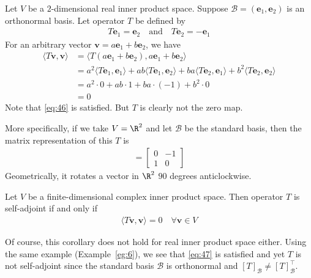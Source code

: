 \documentclass[thmcnt=section, color=blue, 12pt]{my-elegantbook}
\begin{document}
\begin{example} \label{eg:6}
	Let $V$ be a $2$-dimensional real inner product space.
	Suppose $\mathcal{B} = (\mathbf{e}_1, \mathbf{e}_2)$
	is an orthonormal basis.
	Let operator $T$ be defined by 
	\begin{align*}
		T \mathbf{e}_1 = \mathbf{e}_2
		\quad \text{and} \quad 
		T \mathbf{e}_2 = -\mathbf{e}_1
	\end{align*}
	For an arbitrary 
	vector $\mathbf{v} = a\mathbf{e}_1 + b\mathbf{e}_2$,
	we have 
	\begin{align*}
		\langle T \mathbf{v}, \mathbf{v} \rangle
		&= \langle T (a\mathbf{e}_1 + b\mathbf{e}_2), 
		a\mathbf{e}_1 + b \mathbf{e}_2 \rangle \\
		&= a^2 \langle T \mathbf{e}_1, \mathbf{e}_1 \rangle
		+ ab \langle T \mathbf{e}_1, \mathbf{e}_2 \rangle
		+ ba \langle T \mathbf{e}_2, \mathbf{e}_1 \rangle
		+ b^2 \langle T \mathbf{e}_2, \mathbf{e}_2 \rangle \\
		&= a^2 \cdot 0 + ab \cdot 1 + ba \cdot (-1) + b^2 \cdot 0 \\
		&= 0
	\end{align*}
	Note that \eqref{eq:46} is satisfied. 
	But $T$ is clearly not the zero map.

	More specifically, if we take $V = \R^2$ 
	and let $\mathcal{B}$ be the standard basis,
	then the matrix representation of this $T$
	is 
	\begin{align*}
		[T] = \begin{bmatrix}
			0 & -1\\
			1 & 0
		\end{bmatrix}
	\end{align*}
	Geometrically, it rotates a vector in $\R^2$ $90$ degrees anticlockwise. 
\end{example}


\begin{corollary} \label{cor:8}
	Let $V$ be a finite-dimensional complex inner product space.
	Then operator $T$ is self-adjoint if and only if 
	\begin{align}
		\langle T \mathbf{v}, \mathbf{v} \rangle = 0
		\quad \forall \mathbf{v} \in V
		\label{eq:47}
	\end{align}
\end{corollary}

\begin{note}
	Of course, this corollary does
	not hold for real inner product space either.
	Using the same example (Example~\ref{eg:6}),
	we see that \eqref{eq:47} is satisfied 
	and yet $T$ is not self-adjoint
	since the standard basis $\mathcal{B}$ is orthonormal 
	and $[T]_\mathcal{B} \neq [T]^\top_\mathcal{B}$.
\end{note}
\end{document}
